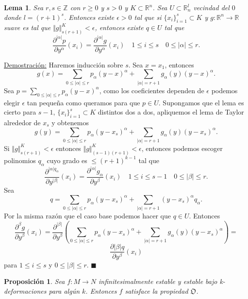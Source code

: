 \documentclass{report}
\newtheorem{prop}[theorem]{Proposici\'on}
\newtheorem{lem}[theorem]{Lema}
\theoremstyle{definition}
\begin{document}
\begin{lem}
Sea $r, s \in \mathbb{Z}$ con $r \geq 0$ y $s >0$ y $K \subset \mathbb{R}^n$. Sea $U \subset \mathbb{R}^l_n$ vecindad del $0$ donde $l = (r+1)^s$. Entonces existe $\epsilon >0$ tal que si $\{ x_i \}_{i=1}^s \subset K$ y $g: \mathbb{R}^n \to \mathbb{R}$ suave es tal que $\Vert g \Vert^K_{s(r+1)} < \epsilon$, entonces existe $q \in U$ tal que $$\frac{\partial^{\vert \alpha \vert} p}{\partial y^\alpha} (x_i) = \frac{\partial^{\vert \alpha \vert }g }{\partial y^\alpha } (x_i) \quad 1 \leq i \leq s \quad 0 \leq \vert \alpha \vert \leq r.$$
\end{lem}
\underline{Demostraci\'on:} Haremos inducci\'on sobre $s$. Sea $x=x_1$, entonces $$g(x) = \sum\limits_{0 \leq \vert \alpha \vert \leq r} p_\alpha (y - x)^\alpha + \sum\limits_{\vert \alpha \vert = r+1} g_\alpha(y)(y-x)^\alpha . $$ 
Sea $p= \sum\limits_{0 \leq \vert \alpha \vert \leq r} p_\alpha (y - x)^\alpha$, como los coeficientes dependen de $\epsilon$ podemos elegir $\epsilon$ tan pequeña como queramos para que $p \in U$.
Supongamos que el lema es cierto para $s-1$, $\{x_i \}_{i=1}^s \subset K$ distintos dos a dos, apliquemos el lema de Taylor alrededor de $x_s$ y obtenemos 
$$g(y) = \sum\limits_{0 \leq \vert \alpha \vert \leq r} p_\alpha (y - x_s)^\alpha + \sum\limits_{\vert \alpha \vert = r+1} g_\alpha(y)(y-x_s)^\alpha . $$ 
Si $\Vert g \Vert_{s(r+1)}^K < \epsilon$ entonces $\Vert g \Vert_{(s-1)(r+1)}^K < \epsilon$, entonces podemos escoger polinomios $ q_\alpha$ cuyo grado es $\leq (r+1)^{k-1}$ tal que $$\frac{\partial^{\vert \alpha \vert q_\alpha}}{ \partial y^{\vert \beta \vert}} (x_i) = \frac{\partial^{\vert \alpha \vert} g_\alpha}{\partial y^\beta} (x_i) \quad 1 \leq i \leq s-1 \quad 0 \leq \vert \beta \vert \leq r .$$
Sea $$q= \sum\limits_{0 \leq \vert \alpha \vert \leq r} p_\alpha (y-x_s)^\alpha + \sum\limits_{ \vert \alpha \vert = r+1} (y-x_s)^\alpha q_\alpha .$$
Por la misma raz\'on que el caso base podemos hacer que $q \in U$. Entonces $$\frac{\partial^\beta g}{\partial y^\beta} (x_i) = \frac{\partial^{\vert \beta \vert }}{\partial y^\beta} \left( \sum\limits_{0 \leq \vert \alpha \vert \leq r} p_\alpha (y - x_s)^\alpha + \sum\limits_{\vert \alpha \vert = r+1} g_\alpha(y)(y-x_s)^\alpha \right) =$$ $$\frac{\partial{\vert \beta \vert }q}{\partial y^\beta} (x_i)$$
para $1 \leq i \leq s$ y $0 \leq \vert \beta \vert \leq r$. $\blacksquare$


\begin{prop} Sea $f:M \to N$ infinitesimalmente estable y estable bajo k-deformaciones para alg\'un $k$. Entonces $f$ satisface la propiedad $\mathfrak{O}$.
\end{prop}
\end{document}
